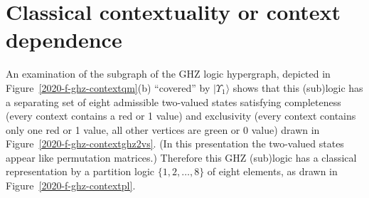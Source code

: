 \begin{figure*}[htb!]
\begin{center}
\end{center}
\caption{\label{2020-f-ghz-contextqm}
Hypergraphs representing  (a) the single quantum mechanical GHZ context in the GHZ basiswhich are the eigenstates of $\sigma_z \sigma_z \sigma_z$,
and (b) the 12 tightly intertwined GHZ contexts in the bases of the eigenstates of
$\sigma_y \sigma_y \sigma_x$, $\sigma_y \sigma_x \sigma_y$, $\sigma_x \sigma_y \sigma_y$,  and $\sigma_x \sigma_x \sigma_x$
with 8 atoms each.
Filled circles indicate states allowed by the original GHZ game yielding a discord with classical means and predictions.
}
\end{figure*}

\section{Classical contextuality or context dependence}

An examination of the subgraph of the GHZ logic hypergraph, depicted in Figure~\ref{2020-f-ghz-contextqm}(b) ``covered'' by $\vert \Upsilon_1 \rangle$
shows that this (sub)logic has a separating set of eight admissible two-valued states
satisfying completeness (every context contains a red or 1 value) and exclusivity (every context contains only one red or 1 value, all other vertices are green or 0 value)
drawn in Figure~\ref{2020-f-ghz-contextghz2vs}. (In this presentation the two-valued states appear like permutation matrices.)
Therefore this GHZ (sub)logic has a classical
representation by a partition logic $\{1,2,\ldots ,8\}$ of eight elements, as drawn in Figure~\ref{2020-f-ghz-contextpl}.

